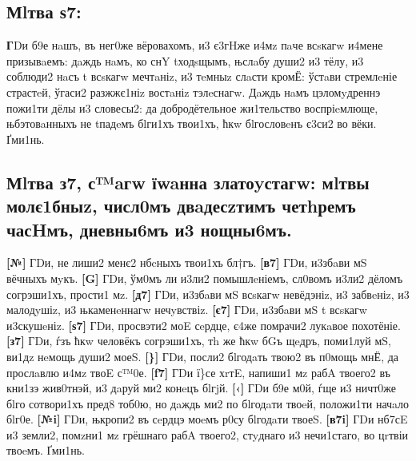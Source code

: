 \subsection{Мlтва ѕ7:}

\textbf{Г}Dи б9е нaшъ, въ нег0же вёровахомъ, и3 є3гHже и4мz пaче всsкагw и4мене
призывaемъ: дaждь нaмъ, ко снY tходsщымъ, њслaбу души2 и3 тёлу, и3
соблюди2 нaсъ t всsкагw мечтaніz, и3 тeмныz слaсти кромЁ: ўстaви
стремлeніе страстeй, ўгаси2 разжжє1ніz востaніz тэлeснагw. Дaждь нaмъ
цэломyдреннэ пожи1ти дёлы и3 словесы2: да добродётельное жи1тельство
воспріeмлюще, њбэтовaнныхъ не tпадeмъ бlги1хъ твои1хъ, ћкw бlгословeнъ
є3си2 во вёки. Ґми1нь.

\subsection{Мlтва з7, с™aгw їwaнна златоyстагw: мlтвы молє1бныz,
    числ0мъ двaдесzтимъ четhремъ часHмъ, дневны6мъ и3
    нощны6мъ.}

\textbf{{[}№{]}} ГDи, не лиши2 менє2 нбcныхъ твои1хъ бл†гъ.
\textbf{{[}в7{]}} ГDи, и3збaви мS вёчныхъ мyкъ. \textbf{{[}G{]}} ГDи,
ўм0мъ ли и3ли2 помышлeніемъ, сл0вомъ и3ли2 дёломъ согрэши1хъ, прости1
мz. \textbf{{[}д7{]}} ГDи, и3збaви мS всsкагw невёдэніz, и3 забвeніz, и3
малодyшіz, и3 њкаменeннагw нечyвствіz. \textbf{{[}є7{]}} ГDи, и3збaви мS
t всsкагw и3скушeніz. \textbf{{[}ѕ7{]}} ГDи, просвэти2 моE сeрдце, є4же
помрачи2 лукaвое похотёніе. \textbf{{[}з7{]}} ГDи, ѓзъ ћкw человёкъ
согрэши1хъ, тh же ћкw бGъ щeдръ, поми1луй мS, ви1дz нeмощь души2 моеS.
\textbf{{[}\}{]}} ГDи, посли2 бlгодaть твою2 въ п0мощь мнЁ, да прослaвлю
и4мz твоE с™0е. \textbf{{[}f7{]}} ГDи ї\}се хrтE, напиши1 мz рабA
твоего2 въ кни1зэ жив0тнэй, и3 дaруй ми2 конeцъ бlгjй. \textbf{{[}‹{]}}
ГDи б9е м0й, ѓще и3 ничт0же бlго сотвори1хъ пред8 тоб0ю, но дaждь ми2 по
бlгодaти твоeй, положи1ти начaло бlг0е. \textbf{{[}№i{]}} ГDи, њкропи2
въ сeрдцэ моeмъ р0су бlгодaти твоеS. \textbf{{[}в7i{]}} ГDи нб7сE и3
земли2, помzни1 мz грёшнаго рабA твоего2, стyднаго и3 нечи1стаго, во
цrтвіи твоeмъ. Ґми1нь.

